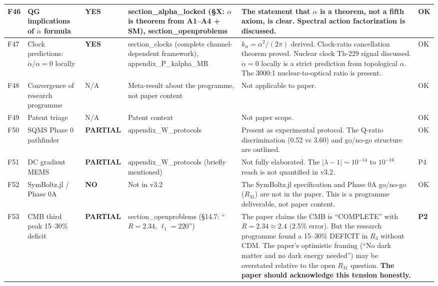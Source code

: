 \documentclass[11pt,a4paper]{article}
\newcommand{\YES}{\textcolor{yes}{\textbf{YES}}}
\newcommand{\PARTIAL}{\textcolor{partial}{\textbf{PARTIAL}}}
\newcommand{\NO}{\textcolor{no}{\textbf{NO}}}
\begin{document}
\begin{longtable}{|p{0.5cm}|p{3.5cm}|p{1.2cm}|p{3.5cm}|p{4.5cm}|p{1cm}|}
F46 & QG implications of $\alpha$ formula &
\YES &
section\_alpha\_locked (\S X: $\alpha$ is theorem from A1--A4 + SM), section\_openproblems &
The statement that $\alpha$ is a theorem, not a fifth axiom, is clear. Spectral action factorization is discussed. &
OK \\
\hline

F47 & Clock predictions: $\dot{\alpha}/\alpha = 0$ locally &
\YES &
section\_clocks (complete channel-dependent framework), appendix\_P\_kalpha\_MR &
$k_\alpha = \alpha^2/(2\pi)$ derived. Clock-ratio cancellation theorem proved. Nuclear clock Th-229 signal discussed. $\dot{\alpha} = 0$ locally is a strict prediction from topological $\alpha$. The 3000:1 nuclear-to-optical ratio is present. &
OK \\
\hline

F48 & Convergence of research programme &
N/A &
Meta-result about the programme, not paper content &
Not applicable to paper. &
OK \\
\hline

F49 & Patent triage &
N/A & Patent context & Not paper scope. & OK \\
\hline

F50 & SQMS Phase 0 pathfinder &
\PARTIAL &
appendix\_W\_protocols &
Present as experimental protocol. The Q-ratio discrimination (0.52 vs 3.60) and go/no-go structure are outlined. &
OK \\
\hline

F51 & DC gradient MEMS &
\PARTIAL &
appendix\_W\_protocols (briefly mentioned) &
Not fully elaborated. The $|\lambda-1| \sim 10^{-14}$ to $10^{-16}$ reach is not quantified in v3.2. &
P4 \\
\hline

F52 & SymBoltz.jl / Phase 0A &
\NO &
Not in v3.2 &
The SymBoltz.jl specification and Phase 0A go/no-go ($R_{31}$) are not in the paper. This is a programme deliverable, not paper content. &
OK \\
\hline

F53 & CMB third peak 15--30\% deficit &
\PARTIAL &
section\_openproblems (\S14.7: ``$R = 2.34$, $\ell_1 = 220$'') &
The paper claims the CMB is ``COMPLETE'' with $R = 2.34 \approx 2.4$ (2.5\% error). But the research programme found a 15--30\% DEFICIT in $R_3$ without CDM. The paper's optimistic framing (``No dark matter and no dark energy needed'') may be overstated relative to the open $R_{31}$ question. \textbf{The paper should acknowledge this tension honestly.} &
\textbf{P2} \\
\hline


\end{longtable}
\end{document}

